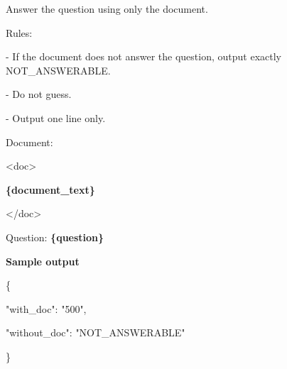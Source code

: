 \begin{tcolorbox}[colback=white, colframe=my-green, coltitle=black, parskip=5mm, title=\textbf{Document-Only Answerability Check with Sample Output}, halign=flush left, enhanced, breakable, skin first=enhanced, skin middle=enhanced, skin last=enhanced]
\begin{scriptsize}
\ttfamily
\setlength{\parindent}{0pt}
Answer the question using only the document.\par
\mbox{}\par
Rules:\par
- If the document does not answer the question, output exactly NOT\_ANSWERABLE.\par
- Do not guess.\par
- Output one line only.\par
\mbox{}\par
Document:\par
\textless{}doc\textgreater{}\par
\textcolor{my-green}{\textbf{\{document\_text\}}}\par
\textless{}/doc\textgreater{}\par
\mbox{}\par
Question: \textcolor{my-green}{\textbf{\{question\}}}\par
\medskip
\normalfont\textbf{Sample output}\par
\ttfamily
\{\par
  "with\_doc": "500",\par
  "without\_doc": "NOT\_ANSWERABLE"\par
\}\par
\end{scriptsize}
\end{tcolorbox}
